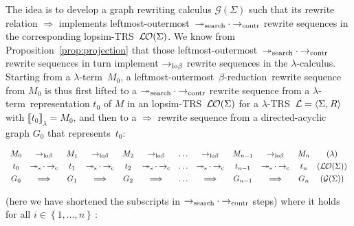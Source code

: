 \documentclass[
submission
]{dmtcs-episciences-tampered}
\newcommand{\fap}[2]{#1({#2})}
\newcommand{\iap}[2]{#1 _{#2}}
\newcommand{\indap}[2]{#1 _{#2}}
\newcommand{\nb}{\nobreakdash}
\newcommand{\nf}{\normalfont}
\newcommand{\tuple}[1]{\langle #1 \rangle}
\newcommand{\tuplespace}{\hspace*{0.5pt}}
\newcommand{\pair}[2]{\tuple{#1, \tuplespace #2}}
\newcommand{\setexp}[1]{\left\{{#1}\right\}}
\newcommand{\bter}{t}
\newcommand{\bteri}{\indap{\bter}}
\newcommand{\asig}{\Sigma}
\newcommand{\arules}{R}
\newcommand{\alTRS}{{\cal L}}
\newcommand{\TRS}{TRS}
\newcommand{\denlter}[1]{\llbracket{#1}\rrbracket_{\sslabs}}
\newcommand{\lopsimTRS}{lopsim-TRS}
\newcommand{\alter}{M}
\newcommand{\alteri}{\indap{\alter}}
\newcommand{\sslabs}{\lambda}
\newcommand{\sred}{\to}
\newcommand{\sredi}{\indap{\sred}}
\newcommand{\smred}{\twoheadrightarrow}
\newcommand{\smredi}{\indap{\smred}}
\newcommand{\scriptsearch}{\text{\nf search}}
\newcommand{\scriptcontract}{\text{\nf contr}}
\newcommand{\ssearchred}{\sredi{\scriptsearch}}
\newcommand{\ssearchmred}{\smredi{\scriptsearch}}
\newcommand{\scontractred}{\sredi{\scriptcontract}}
\newcommand{\scriptlobeta}{\text{\nf lo}\beta}
\newcommand{\slobetared}{\sredi{\scriptlobeta}}
\newcommand{\scomprewrels}[2]{{#1}\cdot{#2}}
\newcommand{\lambdacalculus}{$\lambda$\nb-cal\-cu\-lus}
\newcommand{\lambdaterm}{$\lambda$\nb-term}
\newcommand{\betareduction}{$\beta$\nb-re\-duc\-tion}
\newcommand{\lo}{left\-most-outer\-most}
\newcommand{\lTRS}{$\lambda$\hspace*{-0.5pt}\nb-\hspace*{-0.5pt}\TRS}
\newcommand{\sseamred}{\smredi{\text{\nf s}}}
\newcommand{\sconred}{\sredi{\text{\nf c}}}
\newcommand{\lambdacal}{\lambda}
\newcommand{\graphcal}{\mathcal{G}}
\newcommand{\graphcalwrt}{\fap{\graphcal}}
\newcommand{\agraph}{G}
\newcommand{\agraphi}{\iap{\agraph}}
\newcommand{\sgraphred}{{\Longrightarrow}}
\theoremstyle{plain}
\theoremstyle{definition}
\begin{document}
The idea is to develop a graph rewriting calculus $\graphcalwrt{\asig}$ 
such that its rewrite relation $\sgraphred$ implements
\lo\ $\scomprewrels{\ssearchmred}{\scontractred}$ rewrite sequences in the corresponding \lopsimTRS~$\lopsimTRSwrt{\asig}$.
We know from Proposition~\ref{prop:projection}
that those \lo\ $\scomprewrels{\ssearchmred}{\scontractred}$ rewrite sequences in turn implement
$\slobetared$ rewrite sequences in the \lambdacalculus.
Starting from a \lambdaterm~$\alteri{0}$,
a \lo\ \betareduction\ rewrite sequence from $\alteri{0}$
is thus first lifted to a $\scomprewrels{\ssearchmred}{\scontractred}$ rewrite sequence 
from a \lambdaterm\ representation $\bteri{0}$ of $\alter$
in an \lopsimTRS~$\lopsimTRSwrt{\asig}$ 
for a \lTRS~$\alTRS = \pair{\asig}{\arules}$ with $\denlter{\bteri{0}} = \alteri{0}$,
and then to a $\sgraphred$ rewrite sequence from a directed-acyclic graph $\agraphi{0}$ that represents~$\bteri{0}$:\vspace*{-1.5ex}
\begin{center}
  $
  \begin{array}{ccccccccccc@{\hspace*{2ex}}c}
    \alteri{0}
      & \slobetared &
    \alteri{1}
      & \slobetared &
    \alteri{2}  
      & \slobetared &
        \ldots
      & \slobetared &
    \alteri{n-1}
      & \slobetared &
    \alteri{n}  
        &  (\lambdacal)
    \\[0.75ex]
    \bteri{0}
      & \scomprewrels{\sseamred}{\sconred} &
    \bteri{1}  
      & \scomprewrels{\sseamred}{\sconred} &
    \bteri{2}
      & \scomprewrels{\sseamred}{\sconred} &
        \ldots
      & \scomprewrels{\sseamred}{\sconred} &
    \bteri{n-1}  
      & \scomprewrels{\sseamred}{\sconred} &
    \bteri{n}
        &  (\lopsimTRSwrt{\asig})
    \\[0.75ex]
    \agraphi{0}
      & \sgraphred &
    \agraphi{1}  
      & \sgraphred &
    \agraphi{2}
      & \sgraphred &
        \ldots
      & \sgraphred &
    \agraphi{n-1}  
      & \sgraphred &
    \agraphi{n}
        &  (\graphcalwrt{\asig})
  \end{array}
  $
\end{center}
(here we have shortened the subscripts in $\scomprewrels{\ssearchred}{\scontractred}$ steps)
where it holds for all $i\in\setexp{1,\ldots,n}\,$:
\end{document}
